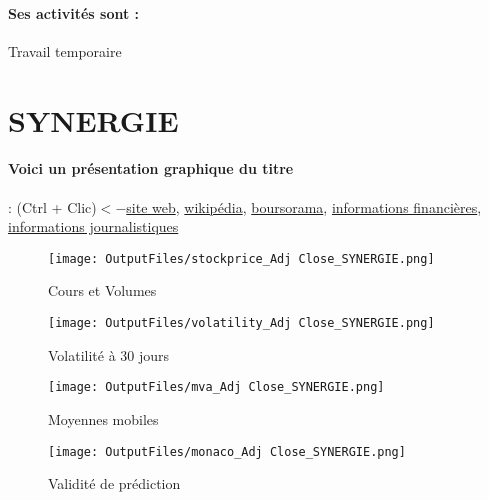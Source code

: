 \documentclass[11pt,a4paper]{report}%
\begin{document}
\paragraph{Ses activités sont : } Travail temporaire 
    
    \newpage

\section{SYNERGIE}

\paragraph{Voici un présentation graphique du titre} : (Ctrl + Clic)$<-$\href{https://www.synergie.com/fr/informations-financieres/publications-rapports-financiers}{site web}, \href{https://fr.wikipedia.org/wiki/Synergie_(entreprise)}{wikipédia}, \href{https://www.boursorama.com/cours/1rPSDG}{boursorama}, \href{https://www.qwant.com/?q=site:https:%2f%2fwww.easybourse.com%2faction-societe%2fSYNERGIE&t=web&client=ext-firefox-hp}{informations financières}, \href{https://bourse.lerevenu.com/cours-de-bourse/fiche-valeur-synthese/SYNERGIE/SDG-FR}{informations journalistiques}
\begin{figure}[!htb]
   \begin{minipage}{0.5\textwidth}
     \centering
     \texttt{[image: OutputFiles/stockprice\_Adj Close\_SYNERGIE.png]}
     \caption{Cours et Volumes}\label{Fig:price_SYNERGIE}
   \end{minipage}\hfill
   \begin{minipage}{0.5\textwidth}
     \centering
     \texttt{[image: OutputFiles/volatility\_Adj Close\_SYNERGIE.png]}
     \caption{Volatilité à 30 jours}\label{Fig:volat_SYNERGIE}
   \end{minipage}
\end{figure}
\begin{figure}[!htb]
   \begin{minipage}{0.5\textwidth}
     \centering
     \texttt{[image: OutputFiles/mva\_Adj Close\_SYNERGIE.png]}
     \caption{Moyennes mobiles}\label{Fig:mva_SYNERGIE}
   \end{minipage}\hfill
   \begin{minipage}{0.5\textwidth}
     \centering
     \texttt{[image: OutputFiles/monaco\_Adj Close\_SYNERGIE.png]}
     \caption{Validité de prédiction}\label{Fig:prediction_SYNERGIE}
   \end{minipage}
\end{figure}
\end{document}
